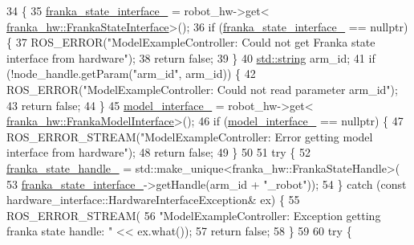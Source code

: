 \begin{DoxyCode}
34                                                               \{
35   \hyperlink{classfranka__example__controllers_1_1ModelExampleController_a299d64b2e65f3d2259ea2468638337e2}{franka\_state\_interface\_} = robot\_hw->get<
      \hyperlink{classfranka__hw_1_1FrankaStateInterface}{franka\_hw::FrankaStateInterface}>();
36   \textcolor{keywordflow}{if} (\hyperlink{classfranka__example__controllers_1_1ModelExampleController_a299d64b2e65f3d2259ea2468638337e2}{franka\_state\_interface\_} == \textcolor{keyword}{nullptr}) \{
37     ROS\_ERROR(\textcolor{stringliteral}{"ModelExampleController: Could not get Franka state interface from hardware"});
38     \textcolor{keywordflow}{return} \textcolor{keyword}{false};
39   \}
40   \hyperlink{namespacetesting_1_1internal_a8e8ff5b11e64078831112677156cb111}{std::string} arm\_id;
41   \textcolor{keywordflow}{if} (!node\_handle.getParam(\textcolor{stringliteral}{"arm\_id"}, arm\_id)) \{
42     ROS\_ERROR(\textcolor{stringliteral}{"ModelExampleController: Could not read parameter arm\_id"});
43     \textcolor{keywordflow}{return} \textcolor{keyword}{false};
44   \}
45   \hyperlink{classfranka__example__controllers_1_1ModelExampleController_a832283a8b75f7e65ee03839a18b54f18}{model\_interface\_} = robot\_hw->get<
      \hyperlink{classfranka__hw_1_1FrankaModelInterface}{franka\_hw::FrankaModelInterface}>();
46   \textcolor{keywordflow}{if} (\hyperlink{classfranka__example__controllers_1_1ModelExampleController_a832283a8b75f7e65ee03839a18b54f18}{model\_interface\_} == \textcolor{keyword}{nullptr}) \{
47     ROS\_ERROR\_STREAM(\textcolor{stringliteral}{"ModelExampleController: Error getting model interface from hardware"});
48     \textcolor{keywordflow}{return} \textcolor{keyword}{false};
49   \}
50 
51   \textcolor{keywordflow}{try} \{
52     \hyperlink{classfranka__example__controllers_1_1ModelExampleController_a6619cd4e5d970fde0779dfa8d5da2b71}{franka\_state\_handle\_} = std::make\_unique<franka\_hw::FrankaStateHandle>(
53         \hyperlink{classfranka__example__controllers_1_1ModelExampleController_a299d64b2e65f3d2259ea2468638337e2}{franka\_state\_interface\_}->getHandle(arm\_id + \textcolor{stringliteral}{"\_robot"}));
54   \} \textcolor{keywordflow}{catch} (\textcolor{keyword}{const} hardware\_interface::HardwareInterfaceException& ex) \{
55     ROS\_ERROR\_STREAM(
56         \textcolor{stringliteral}{"ModelExampleController: Exception getting franka state handle: "} << ex.what());
57     \textcolor{keywordflow}{return} \textcolor{keyword}{false};
58   \}
59 
60   \textcolor{keywordflow}{try} \{

\end{DoxyCode}
